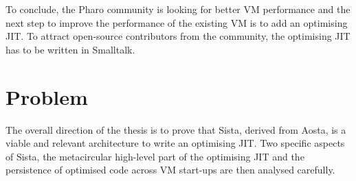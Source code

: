 \documentclass[a4paper,12pt,twoside]{../includes/ThesisStyle}
\begin{document}
	
To conclude, the Pharo community is looking for better VM performance and the next step to improve the performance of the existing VM is to add an optimising JIT. To attract open-source contributors from the community, the optimising JIT has to be written in Smalltalk.



\section{Problem}

The overall direction of the thesis is to prove that Sista, derived from Aosta, is a viable and relevant architecture to write an optimising JIT. Two specific aspects of Sista, the metacircular high-level part of the optimising JIT and the persistence of optimised code across VM start-ups are then analysed carefully.
\end{document}
